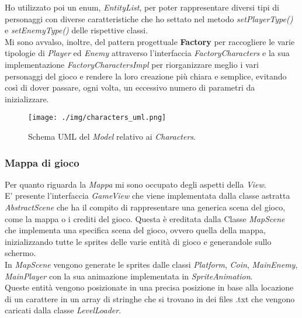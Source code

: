\textsf{\small Ho utilizzato poi un enum, \emph{EntityList}, per poter rappresentare diversi tipi di personaggi con diverse caratteristiche che ho settato nel metodo \emph{setPlayerType()} e \emph{setEnemyType()} delle rispettive classi. }\\

\textsf{\small Mi sono avvalso, inoltre, del pattern progettuale \textbf{Factory} per raccogliere le varie tipologie di \emph{Player} ed \emph{Enemy} attraverso l'interfaccia \emph{FactoryCharacters} e la sua implementazione \emph{FactoryCharactersImpl} per riorganizzare meglio i vari personaggi del gioco e rendere la loro creazione più chiara e semplice, evitando così di dover passare, ogni volta, un eccessivo numero di parametri da inizializzare.}

\begin{figure}[H]
	\centering{}
	\texttt{[image: ./img/characters\_uml.png]} 
	\caption{Schema UML del \emph{Model} relativo ai \emph{Characters}.}
	\label{img:uml_model_characters}
\end{figure}

\subsubsection*{Mappa di gioco} %

\textsf{\small Per quanto riguarda la \emph{Mappa} mi sono occupato degli aspetti della \emph{View}.}\\

\textsf{\small E' presente l'interfaccia \emph{GameView} che viene implementata dalla classe astratta \emph{AbstractScene} che ha il compito di rappresentare una generica scena del gioco, come la mappa o i crediti del gioco. Questa è ereditata dalla Classe \emph{MapScene} che implementa una specifica scena del gioco, ovvero quella della mappa, inizializzando tutte le sprites delle varie entità di gioco e generandole sullo schermo.}\\

\textsf{\small In \emph{MapScene} vengono generate le sprites dalle classi \emph{Platform}, \emph{Coin}, \emph{MainEnemy}, \emph{MainPlayer} con la sua animazione implementata in \emph{SpriteAnimation}.}\\

\textsf{\small Queste entità vengono posizionate in una precisa posizione in base alla locazione di un carattere in un array di stringhe che si trovano in dei files .txt che vengono caricati dalla classe \emph{LevelLoader}.} %

